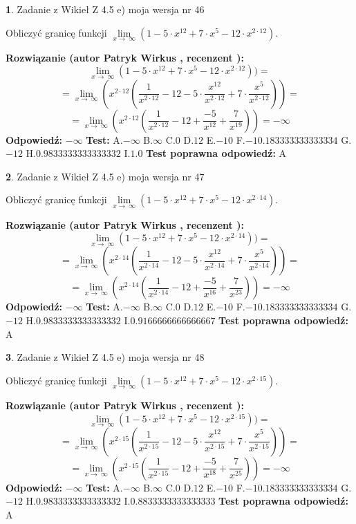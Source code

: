 \documentclass[12pt, a4paper]{article}
\theoremstyle{definition} %
\newtheorem{zad}{}
\newcommand{\zadStart}[1]{\begin{zad}#1\newline}
\newcommand{\zadStop}{\end{zad}}
\newcommand{\rozwStart}[2]{\noindent \textbf{Rozwiązanie (autor #1 , recenzent #2): }\newline}
\newcommand{\rozwStop}{\newline}
\newcommand{\odpStart}{\noindent \textbf{Odpowiedź:}\newline}
\newcommand{\odpStop}{\newline}
\newcommand{\testStart}{\noindent \textbf{Test:}\newline}
\newcommand{\testStop}{\newline}
\newcommand{\kluczStart}{\noindent \textbf{Test poprawna odpowiedź:}\newline}
\newcommand{\kluczStop}{\newline}
\begin{document}
\zadStart{Zadanie z Wikieł Z 4.5 e) moja wersja nr 46}


Obliczyć granicę funkcji  $\lim\limits_{x\to\ \infty}(1 - 5 \cdot x^{12}+7 \cdot x^{5}- 12 \cdot x^{2\cdot12})$.
\zadStop
\rozwStart{Patryk Wirkus}{}
$$\lim\limits_{x\to\ \infty}(1 - 5 \cdot x^{12}+7 \cdot x^{5}- 12 \cdot x^{2\cdot12}))=$$
$$=\lim\limits_{x\to\ \infty}(x^{2\cdot12}(\frac{1}{x^{2\cdot12}}-12 -5 \cdot \frac{x^{12}}{x^{2\cdot12}}+7 \cdot \frac{x^{5}}{x^{2\cdot12}}))=$$
$$=\lim\limits_{x\to\ \infty}(x^{2\cdot12}(\frac{1}{x^{2\cdot12}}-12 + \frac{-5}{x^{12}}+ \frac{7}{x^{19}}))=-\infty$$
\rozwStop
\odpStart
$-\infty$
\odpStop
\testStart
A.$-\infty$ B.$\infty$ C.$0$ D.$12$ E.$-10$
F.$-10.183333333333334$ G.$-12$
H.$0.9833333333333332$
I.$1.0$
\testStop
\kluczStart
A
\kluczStop



\zadStart{Zadanie z Wikieł Z 4.5 e) moja wersja nr 47}


Obliczyć granicę funkcji  $\lim\limits_{x\to\ \infty}(1 - 5 \cdot x^{12}+7 \cdot x^{5}- 12 \cdot x^{2\cdot14})$.
\zadStop
\rozwStart{Patryk Wirkus}{}
$$\lim\limits_{x\to\ \infty}(1 - 5 \cdot x^{12}+7 \cdot x^{5}- 12 \cdot x^{2\cdot14}))=$$
$$=\lim\limits_{x\to\ \infty}(x^{2\cdot14}(\frac{1}{x^{2\cdot14}}-12 -5 \cdot \frac{x^{12}}{x^{2\cdot14}}+7 \cdot \frac{x^{5}}{x^{2\cdot14}}))=$$
$$=\lim\limits_{x\to\ \infty}(x^{2\cdot14}(\frac{1}{x^{2\cdot14}}-12 + \frac{-5}{x^{16}}+ \frac{7}{x^{23}}))=-\infty$$
\rozwStop
\odpStart
$-\infty$
\odpStop
\testStart
A.$-\infty$ B.$\infty$ C.$0$ D.$12$ E.$-10$
F.$-10.183333333333334$ G.$-12$
H.$0.9833333333333332$
I.$0.9166666666666667$
\testStop
\kluczStart
A
\kluczStop



\zadStart{Zadanie z Wikieł Z 4.5 e) moja wersja nr 48}


Obliczyć granicę funkcji  $\lim\limits_{x\to\ \infty}(1 - 5 \cdot x^{12}+7 \cdot x^{5}- 12 \cdot x^{2\cdot15})$.
\zadStop
\rozwStart{Patryk Wirkus}{}
$$\lim\limits_{x\to\ \infty}(1 - 5 \cdot x^{12}+7 \cdot x^{5}- 12 \cdot x^{2\cdot15}))=$$
$$=\lim\limits_{x\to\ \infty}(x^{2\cdot15}(\frac{1}{x^{2\cdot15}}-12 -5 \cdot \frac{x^{12}}{x^{2\cdot15}}+7 \cdot \frac{x^{5}}{x^{2\cdot15}}))=$$
$$=\lim\limits_{x\to\ \infty}(x^{2\cdot15}(\frac{1}{x^{2\cdot15}}-12 + \frac{-5}{x^{18}}+ \frac{7}{x^{25}}))=-\infty$$
\rozwStop
\odpStart
$-\infty$
\odpStop
\testStart
A.$-\infty$ B.$\infty$ C.$0$ D.$12$ E.$-10$
F.$-10.183333333333334$ G.$-12$
H.$0.9833333333333332$
I.$0.8833333333333333$
\testStop
\kluczStart
A
\kluczStop
\end{document}
